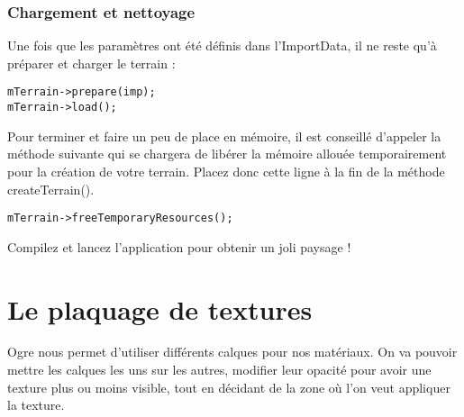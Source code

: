 \documentclass[10pt,a4paper]{report}
\begin{document}
\subsubsection{Chargement et nettoyage}


Une fois que les param\`etres ont \'et\'e d\'efinis dans l'ImportData, il ne reste qu'\`a pr\'eparer et charger le terrain :

\begin{lstlisting}[caption={Pr\'eparation et chargement du terrain}]
mTerrain->prepare(imp);
mTerrain->load();
\end{lstlisting}

Pour terminer et faire un peu de place en m\'emoire, il est conseill\'e d'appeler la m\'ethode suivante qui se chargera de lib\'erer la m\'emoire allou\'ee temporairement pour la cr\'eation de votre terrain. Placez donc cette ligne \`a la fin de la m\'ethode createTerrain().

\begin{lstlisting}[caption={Lib\'eration de place en m\'emoire}]
mTerrain->freeTemporaryResources();
\end{lstlisting}

Compilez et lancez l'application pour obtenir un joli paysage !


































\section{Le plaquage de textures}


Ogre nous permet d'utiliser diff\'erents calques pour nos mat\'eriaux. On va pouvoir mettre les calques les uns sur les autres, modifier leur opacit\'e pour avoir une texture plus ou moins visible, tout en d\'ecidant de la zone o\`u l'on veut appliquer la texture.
\end{document}
